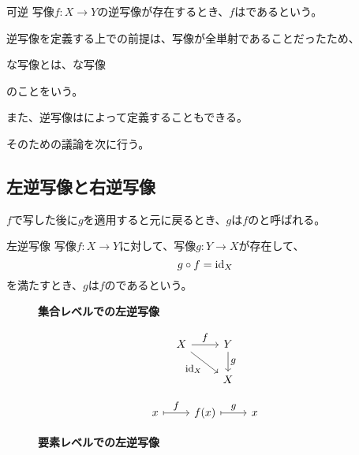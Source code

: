 \documentclass[../../../topic_linear-algebra]{subfiles}
\begin{document}
\begin{definition*}{可逆}
  写像$f \colon X \to Y$の逆写像が存在するとき、$f$はであるという。
\end{definition*}

逆写像を定義する上での前提は、写像が全単射であることだったため、
\begin{emphabox}
  \begin{spacebox}
    \begin{center}
      な写像とは、な写像
    \end{center}
  \end{spacebox}
\end{emphabox}
のことをいう。

\br

また、逆写像はによって定義することもできる。

そのための議論を次に行う。

\subsection{左逆写像と右逆写像}

$f$で写した後に$g$を適用すると元に戻るとき、$g$は$f$のと呼ばれる。

\begin{definition*}{左逆写像}
  写像$f\colon X \to Y$に対して、写像$g\colon Y \to X$が存在して、
  \begin{equation*}
    g \circ f = \operatorname{id}_X
  \end{equation*}
  を満たすとき、$g$は$f$のであるという。
\end{definition*}

\begin{figure}[h]
  \centering
  \begin{minipage}[t]{0.45\textwidth}
    \caption*{\bfseries 集合レベルでの左逆写像}
    \begin{equation*}
      \begin{tikzcd}[every label/.append style = {font = \small}]
        X \arrow[r, "f"] \arrow[dr, swap, "\id_X"] & Y \arrow[d, "g"] \\
        & X
      \end{tikzcd}
    \end{equation*}
  \end{minipage}
  \begin{minipage}[t]{0.45\textwidth}
    \caption*{\bfseries 要素レベルでの左逆写像}
    \begin{equation*}
      \begin{tikzcd}[every label/.append style = {font = \small}]
        x \arrow[r,mapsto, "f"] & f(x) \arrow[r,mapsto, "g"] & x
      \end{tikzcd}
    \end{equation*}
  \end{minipage}
\end{figure}
\end{document}

